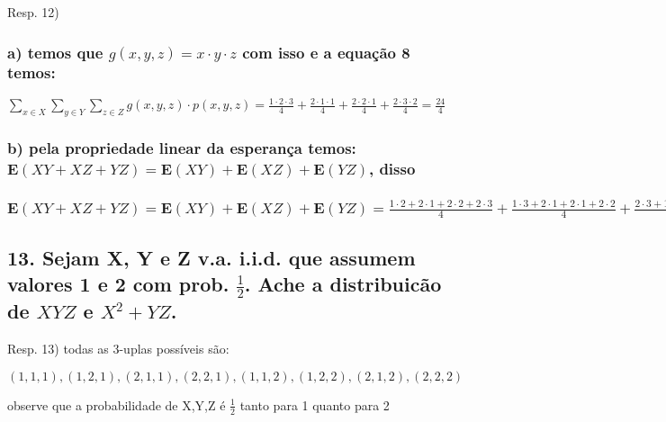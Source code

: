 \documentclass[english]{article}
\begin{document}
Resp. 12)


\subsubsection*{\textmd{a) temos que $g(x,y,z)=x\cdot y\cdot z$ com isso e a equação
8 temos:}}

$\sum_{x\in X}\sum_{y\in Y}\sum_{z\in Z}g(x,y,z)\cdot p(x,y,z)=\frac{1\cdot2\cdot3}{4}+\frac{2\cdot1\cdot1}{4}+\frac{2\cdot2\cdot1}{4}+\frac{2\cdot3\cdot2}{4}=\frac{24}{4}$


\subsubsection*{\textmd{b) pela propriedade linear da esperança temos: }$\mathbf{E}(XY+XZ+YZ)=\mathbf{E}(XY)+\mathbf{E}(XZ)+\mathbf{E}(YZ)$,
\textmd{disso}}


\subsubsection*{$\mathbf{E}(XY+XZ+YZ)=\mathbf{E}(XY)+\mathbf{E}(XZ)+\mathbf{E}(YZ)=\frac{1\cdot2+2\cdot1+2\cdot2+2\cdot3}{4}+\frac{1\cdot3+2\cdot1+2\cdot1+2\cdot2}{4}+\frac{2\cdot3+1\cdot1+2\cdot1+3\cdot2}{4}=\frac{40}{4}$}


\subsection*{\textmd{13. Sejam X, Y e Z v.a. i.i.d. que assumem valores 1 e 2
com prob. $\frac{1}{2}$. Ache a distribuicão de $XYZ$ e $X^{2}+YZ$. }}

Resp. 13) todas as 3-uplas possíveis são:

$(1,1,1),(1,2,1),(2,1,1),(2,2,1),(1,1,2),(1,2,2),(2,1,2),(2,2,2)$

observe que a probabilidade de X,Y,Z é $\frac{1}{2}$ tanto para 1
quanto para 2
\end{document}
